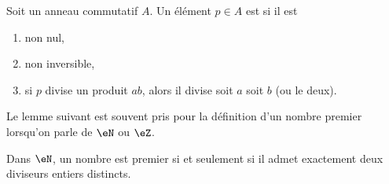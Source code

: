 \begin{definition}       \label{DEFooZCRQooWXRalw}
    Soit un anneau commutatif \( A\). Un élément \( p\in A\) est  si il est
    \begin{enumerate}
        \item
            non nul,
        \item
            non inversible,
        \item       \label{ITEMooPMTTooCVHPIm}
            si \( p\) divise un produit \( ab\), alors il divise soit \( a\) soit \( b\) (ou le deux).
    \end{enumerate}
\end{definition}


Le lemme suivant est souvent pris pour la définition d'un nombre premier lorsqu'on parle de \( \eN\) ou \( \eZ\).
\begin{lemma}
    Dans \( \eN\), un nombre est premier si et seulement si il admet exactement deux diviseurs entiers distincts.
\end{lemma}

